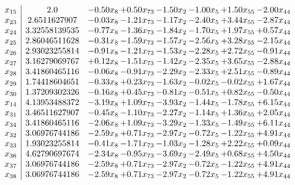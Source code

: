 \documentclass[8pt]{article}
\begin{document}
\[\begin{array}{c| c c@{\hskip 2pt} c@{\hskip 2pt} c@{\hskip 2pt} c@{\hskip 2pt} c@{\hskip 2pt} c@{\hskip 2pt} }
 x_{15}   &  2.0 & -0.50 x_{8} & +  0.50 x_{73} & -1.50 x_{2} & -1.00 x_{5} & +  1.50 x_{55} & -2.00 x_{44}\\
 x_{23}   &  2.6511627907 & -0.03 x_{8} & -1.21 x_{73} & -1.17 x_{2} & -2.40 x_{5} & +  3.44 x_{55} & -2.87 x_{44}\\
 x_{24}   &  3.32558139535 & -0.77 x_{8} & -1.36 x_{73} & -1.84 x_{2} & -1.70 x_{5} & +  1.97 x_{55} & +  0.57 x_{44}\\
 x_{25}   &  2.86046511628 & -0.31 x_{8} & -1.59 x_{73} & -1.57 x_{2} & -2.56 x_{5} & +  3.28 x_{55} & -2.15 x_{44}\\
 x_{26}   &  2.93023255814 & -0.91 x_{8} & -1.21 x_{73} & -1.53 x_{2} & -2.28 x_{5} & +  2.72 x_{55} & -0.91 x_{44}\\
 x_{27}   &  3.16279069767 & +  0.12 x_{8} & -1.51 x_{73} & -1.42 x_{2} & -2.35 x_{5} & +  3.65 x_{55} & -2.88 x_{44}\\
 x_{28}   &  3.41860465116 & -0.06 x_{8} & -0.91 x_{73} & -2.29 x_{2} & -2.33 x_{5} & +  2.51 x_{55} & -0.89 x_{44}\\
 x_{29}   &  1.74418604651 & -0.33 x_{8} & +  0.23 x_{73} & -1.63 x_{2} & -0.02 x_{5} & -0.02 x_{55} & +  1.67 x_{44}\\
 x_{30}   &  1.37209302326 & -0.16 x_{8} & +  0.45 x_{73} & -0.81 x_{2} & -0.51 x_{5} & +  0.82 x_{55} & -0.50 x_{44}\\
 x_{14}   &  4.13953488372 & -3.19 x_{8} & +  1.09 x_{73} & -3.93 x_{2} & -1.44 x_{5} & -1.78 x_{55} & +  6.15 x_{44}\\
 x_{31}   &  3.46511627907 & -0.45 x_{8} & -1.10 x_{73} & -2.27 x_{2} & -1.14 x_{5} & +  1.36 x_{55} & +  2.05 x_{44}\\
 x_{34}   &  3.41860465116 & -2.06 x_{8} & +  1.09 x_{73} & -3.29 x_{2} & -1.33 x_{5} & -1.49 x_{55} & +  6.11 x_{44}\\
 x_{32}   &  3.06976744186 & -2.59 x_{8} & +  0.71 x_{73} & -2.97 x_{2} & -0.72 x_{5} & -1.22 x_{55} & +  4.91 x_{44}\\
 x_{33}   &  1.93023255814 & -0.41 x_{8} & -1.71 x_{73} & -1.03 x_{2} & -1.28 x_{5} & +  2.22 x_{55} & +  0.09 x_{44}\\
 x_{36}   &  4.62790697674 & -2.34 x_{8} & -0.95 x_{73} & -3.69 x_{2} & -2.49 x_{5} & +  0.68 x_{55} & +  4.50 x_{44}\\
 x_{37}   &  3.06976744186 & -2.59 x_{8} & +  0.71 x_{73} & -2.97 x_{2} & -0.72 x_{5} & -1.22 x_{55} & +  4.91 x_{44}\\
 x_{38}   &  3.06976744186 & -2.59 x_{8} & +  0.71 x_{73} & -2.97 x_{2} & -0.72 x_{5} & -1.22 x_{55} & +  4.91 x_{44}\\

\end{array}\]
\end{document}
